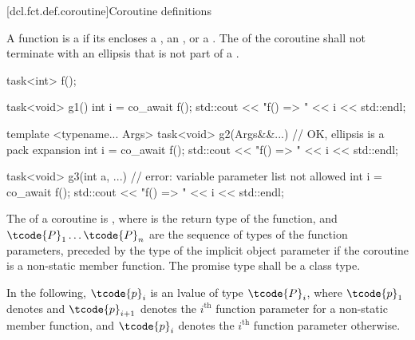 [dcl.fct.def.coroutine]{Coroutine definitions}%
%

\pnum
A function is a  if its  encloses a
,
an ,
or a .
The  of the coroutine shall not
terminate with an ellipsis that is not part of
a .

\pnum
\begin{example}
\begin{codeblock}
task<int> f();

task<void> g1() {
  int i = co_await f();
  std::cout << "f() => " << i << std::endl;
}

template <typename... Args>
task<void> g2(Args&&...) {      // OK, ellipsis is a pack expansion
  int i = co_await f();
  std::cout << "f() => " << i << std::endl;
}

task<void> g3(int a, ...) {     // error: variable parameter list not allowed
  int i = co_await f();
  std::cout << "f() => " << i << std::endl;
}
\end{codeblock}
\end{example}

\pnum
{}%
The  of a coroutine is
,
where
 is the return type of the function, and
$\tcode{P}_1 \dotsc \tcode{P}_n$ are the sequence of types of the function parameters,
preceded by the type of the implicit object parameter
if the coroutine is a non-static member function.
The promise type shall be a class type.

\pnum
In the following, $\tcode{p}_i$ is an lvalue of type $\tcode{P}_i$,
where
$\tcode{p}_1$ denotes  and
$\tcode{p}_{i+1}$ denotes the $i^\textrm{th}$ function parameter
for a non-static member function, and
$\tcode{p}_i$ denotes
the $i^\textrm{th}$ function parameter otherwise.


